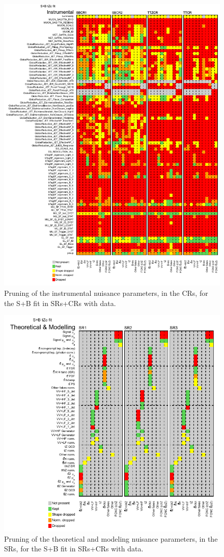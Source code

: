 \begin{figure}[htbp]
	\centering
	\includegraphics[width=.9\textwidth]{Chapters/CH8/figures/SPLUSB_CRSR_DL1rc_unblind/Pruning_split2}
	\caption{Pruning of the instrumental nuisance parameters, in the CRs, for the S+B \tZc fit in SRs+CRs with data.}%
	\label{fig:stat:tzc:splusb:crsr:pruning_unb2}
\end{figure}
\begin{figure}[htbp]
	\centering
	\includegraphics[width=.65\textwidth]{Chapters/CH8/figures/SPLUSB_CRSR_DL1rc_unblind/Pruning_split3}
	\caption{Pruning of the theoretical and modeling nuisance parameters, in the SRs, for the S+B \tZc fit in SRs+CRs with data.}%
	\label{fig:stat:tzc:splusb:crsr:pruning_unb3}
\end{figure}
